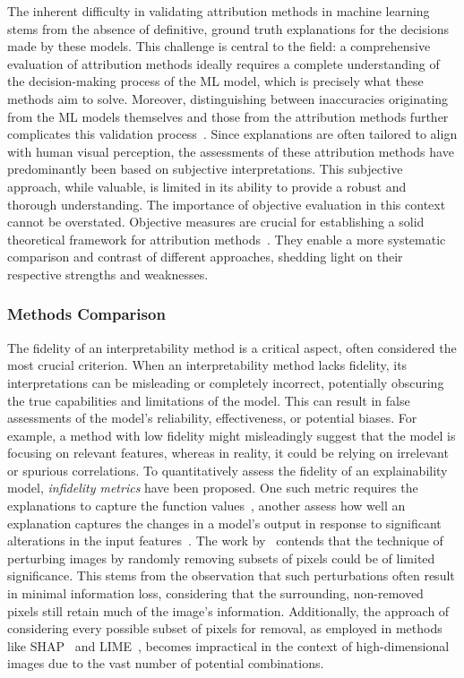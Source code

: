 The inherent difficulty in validating attribution methods in machine learning stems from the absence of definitive, ground truth explanations for the decisions made by these models. This challenge is central to the field: a comprehensive evaluation of attribution methods ideally requires a complete understanding of the decision-making process of the ML model, which is precisely what these methods aim to solve. Moreover, distinguishing between inaccuracies originating from the ML models themselves and those from the attribution methods further complicates this validation process~\cite{SundararajanTY17}. Since explanations are often tailored to align with human visual perception, the assessments of these attribution methods have predominantly been based on subjective interpretations. This subjective approach, while valuable, is limited in its ability to provide a robust and thorough understanding. The importance of objective evaluation in this context cannot be overstated. Objective measures are crucial for establishing a solid theoretical framework for attribution methods~\cite{yeh2019infidelity}. They enable a more systematic comparison and contrast of different approaches, shedding light on their respective strengths and weaknesses. 

\subsubsection{Methods Comparison}

The fidelity of an interpretability method is a critical aspect, often considered the most crucial criterion. When an interpretability method lacks fidelity, its interpretations can be misleading or completely incorrect, potentially obscuring the true capabilities and limitations of the model. This can result in false assessments of the model's reliability, effectiveness, or potential biases. For example, a method with low fidelity might misleadingly suggest that the model is focusing on relevant features, whereas in reality, it could be relying on irrelevant or spurious correlations. To quantitatively assess the fidelity of an explainability model, \emph{infidelity metrics} have been proposed. One such metric requires the explanations to capture the function values~\cite{PlumbMT18}, another assess how well an explanation captures the changes in a model's output in response to significant alterations in the input features~\cite{YehHSIR19}. The work by~\cite{YehHSIR19} contends that the technique of perturbing images by randomly removing subsets of pixels could be of limited significance. This stems from the observation that such perturbations often result in minimal information loss, considering that the surrounding, non-removed pixels still retain much of the image's information. Additionally, the approach of considering every possible subset of pixels for removal, as employed in methods like SHAP~\cite{LundbergL17} and LIME~\cite{Ribeiro0G16}, becomes impractical in the context of high-dimensional images due to the vast number of potential combinations.



